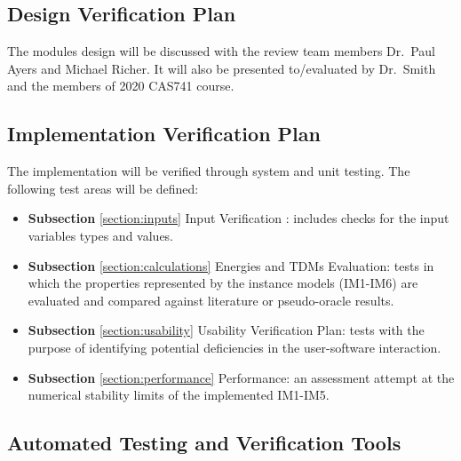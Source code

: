 \documentclass[12pt, titlepage]{article}
\begin{document}
\subsection{Design Verification Plan}

The modules design will be discussed with the review team members Dr.\ Paul 
Ayers and Michael Richer. It will also be presented to/evaluated by Dr.\ Smith 
and the members of 2020 CAS741 course.

\subsection{Implementation Verification Plan}

%
The implementation will be verified through system and unit testing. The 
following test areas will be defined:
\begin{itemize}
	\item \textbf{Subsection} \ref{section:inputs} Input Verification : 
	includes checks for the input variables types and values.
	
	\item \textbf{Subsection} 
	\ref{section:calculations} Energies and TDMs Evaluation: tests in 
	which the properties represented by the instance models (IM1-IM6) are 
	evaluated and compared against literature or pseudo-oracle results.
	
	\item \textbf{Subsection} \ref{section:usability} Usability Verification 
	Plan: tests with the purpose of identifying potential deficiencies in the 
	user-software interaction.
	
	\item \textbf{Subsection} \ref{section:performance} Performance: an 
	assessment attempt at the numerical stability limits of the implemented 
	IM1-IM5.
\end{itemize}


\subsection{Automated Testing and Verification Tools}
\end{document}

